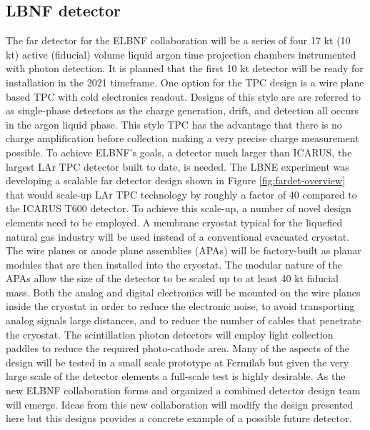 
\subsection{LBNF detector}

The far detector for the ELBNF collaboration will be a series of four 17 kt (10 kt) active (fiducial) volume  liquid argon time projection chambers instrumented with photon detection. It is planned that the first 10 kt detector will be ready for installation in the 2021 timeframe. One option for the TPC design is a wire plane based TPC with cold electronics readout. Designs of this style are are referred to as single-phase detectors as the charge generation, drift, and detection all occurs in the argon liquid phase. This style TPC has the advantage that there is no charge amplification before collection making a very precise charge measurement possible. To achieve ELBNF's goals, a detector much larger than ICARUS, the largest LAr TPC detector built to date, is needed. The LBNE experiment was developing a scalable far detector design shown in Figure \ref{fig:fardet-overview} that would scale-up LAr TPC technology by roughly a factor of 40 compared to the ICARUS T600 detector. To achieve this scale-up, a number of novel design elements need to be employed. A membrane cryostat typical for the liquefied natural gas industry will be used instead of a conventional evacuated cryostat. The wire planes or anode plane assemblies (APAs) will be factory-built as planar modules that are then installed into the cryostat. The modular nature of the APAs allow the size of the detector to be scaled up to at least 40 kt fiducial mass. Both the analog and digital electronics will be mounted on the wire planes inside the cryostat in order to reduce the electronic noise, to avoid transporting analog signals large distances, and to reduce the number of cables that penetrate the cryostat. The scintillation photon detectors will employ light collection paddles to reduce the required photo-cathode area. Many of the aspects of the design will be tested in a small scale prototype at Fermilab but given the very large scale of the detector elements a full-scale test is highly desirable. As the new ELBNF collaboration forms and organized a combined detector design team will emerge. Ideas from this new collaboration will modify the design presented here but this designs provides a concrete example of a possible future detector. 



